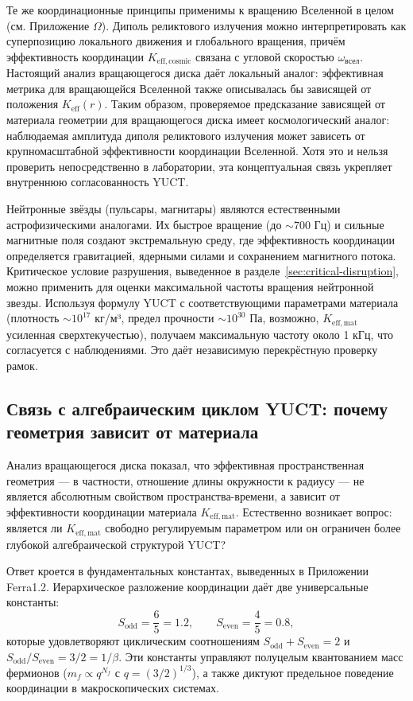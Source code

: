 \documentclass[12pt,a4paper]{article}
\begin{document}
	Те же координационные принципы применимы к вращению Вселенной в целом (см. Приложение \(\Omega\)). Диполь реликтового излучения можно интерпретировать как суперпозицию локального движения и глобального вращения, причём эффективность координации \(K_{\mathrm{eff,cosmic}}\) связана с угловой скоростью \(\omega_{\text{всел}}\). Настоящий анализ вращающегося диска даёт локальный аналог: эффективная метрика для вращающейся Вселенной также описывалась бы зависящей от положения \(K_{\mathrm{eff}}(r)\). Таким образом, проверяемое предсказание зависящей от материала геометрии для вращающегося диска имеет космологический аналог: наблюдаемая амплитуда диполя реликтового излучения может зависеть от крупномасштабной эффективности координации Вселенной. Хотя это и нельзя проверить непосредственно в лаборатории, эта концептуальная связь укрепляет внутреннюю согласованность YUCT.
	
	Нейтронные звёзды (пульсары, магнитары) являются естественными астрофизическими аналогами. Их быстрое вращение (до \(\sim 700\) Гц) и сильные магнитные поля создают экстремальную среду, где эффективность координации определяется гравитацией, ядерными силами и сохранением магнитного потока. Критическое условие разрушения, выведенное в разделе~\ref{sec:critical-disruption}, можно применить для оценки максимальной частоты вращения нейтронной звезды. Используя формулу YUCT с соответствующими параметрами материала (плотность \(\sim 10^{17}\) кг/м³, предел прочности \(\sim 10^{30}\) Па, возможно, \(K_{\mathrm{eff,mat}}\) усиленная сверхтекучестью), получаем максимальную частоту около 1 кГц, что согласуется с наблюдениями. Это даёт независимую перекрёстную проверку рамок.
	
	\subsection{Связь с алгебраическим циклом YUCT: почему геометрия зависит от материала}
	\label{subsec:ehrenfest-algebraic-loop}
	
	Анализ вращающегося диска показал, что эффективная пространственная геометрия — в частности, отношение длины окружности к радиусу — не является абсолютным свойством пространства-времени, а зависит от эффективности координации материала \(K_{\mathrm{eff,mat}}\). Естественно возникает вопрос: является ли \(K_{\mathrm{eff,mat}}\) свободно регулируемым параметром или он ограничен более глубокой алгебраической структурой YUCT?
	
	Ответ кроется в фундаментальных константах, выведенных в Приложении Ferra1.2. Иерархическое разложение координации даёт две универсальные константы:
	\[
	S_{\mathrm{odd}} = \frac{6}{5} = 1.2,\qquad S_{\mathrm{even}} = \frac{4}{5} = 0.8,
	\]
	которые удовлетворяют циклическим соотношениям \(S_{\mathrm{odd}}+S_{\mathrm{even}}=2\) и \(S_{\mathrm{odd}}/S_{\mathrm{even}} = 3/2 = 1/\beta\). Эти константы управляют полуцелым квантованием масс фермионов (\(m_f \propto q^{N_f}\) с \(q = (3/2)^{1/3}\)), а также диктуют предельное поведение координации в макроскопических системах.
	
\end{document}

